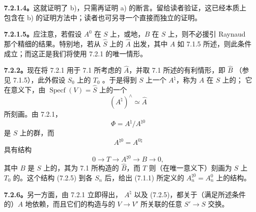\textbf{7.2.1.4。}这就证明了 b)，只需再证明 a) 的断言。留给读者验证，这已经本质上包含在 b) 的证明方法中；读者也可另寻一个直接而独立的证明。

\textbf{7.2.1.5。}应注意，若假设 $A^0$ 在 $S$ 上，或地，$B$ 在 $S$ 上，则不必援引 Raynaud 那个精细的结果。特别地，若从 $\widehat S$ 上的 $\widehat A$ 出发，其中 $A$ 如 7.1.5 所述，则此条件成立；而这正是我们将使用 7.2.1 的唯一情形。

\textbf{7.2.2。}现在将 7.2.1 用于 7.1 所考虑的 $\widehat A$，并取 7.1 所述的有利情形，即 $\widehat B$ （参见 7.1.5），此外假设 $S_0$ 上的 $T_0$ 。于是得到 $S$ 上一个 $A^\natural$，称为 $A$ 在 $S$ 上的；
它在意义下，由 $\operatorname{Specf}(V)=\widehat S$ 上的一个
\begin{equation}\tag{7.2.3}
 (A^\natural)^\wedge\simeq\widehat A
\end{equation}
所刻画。由 7.2.1，
\begin{equation}\tag{7.2.4}
 \Phi=A^\natural/A^{\natural0}
\end{equation}
是 $S$ 上的群，而
\[
 A^{\natural0}=A^{0\natural}
\]
具有结构
\begin{equation}\tag{7.2.5}
 0\longrightarrow T\longrightarrow A^{\natural0}\longrightarrow B\longrightarrow0,
\end{equation}
其中 $B$ 是 $S$ 上的，其为 7.1 所构造的 $\widehat B$，而 $T$ 则（在唯一意义下）刻画为 $S$ 上 $T_0$ 的。这个结构 (7.2.5) 到各 $S_n$ 后，给出 (7.1.1) 所定义的 $A_n^{\natural0}=A_n^0$ 上的结构。

\textbf{7.2.6。}另一方面，由 7.2.1 立即得出， $A^\natural$ 以及 (7.2.5)，都关于（满足所述条件的）$A$ 地依赖，而且它们的构造与的 $V\to V'$ 所关联的任意 $S'\to S$ 交换。

